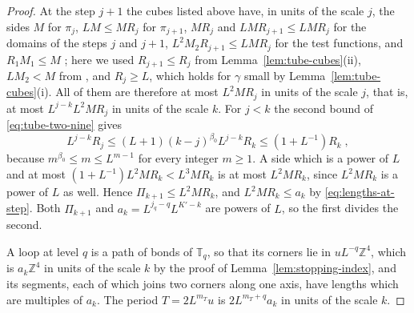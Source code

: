 \documentclass[11pt]{preprint}
\numberwithin{equation}{section}
\theoremstyle{definition}
\theoremstyle{remark}
\theoremstyle{plain}
\begin{document}
\begin{proof}
At the step $j + 1$ the cubes listed above have, in units of the scale $j$, the sides $M$ for $\pi_j$, $LM \leq MR_j$ for $\pi_{j+1}$, $MR_j$ and $LMR_{j+1} \leq LMR_j$ for the domains of the steps $j$ and $j + 1$, $L^2M_2R_{j+1} \leq LMR_j$ for the test functions, and $R_1M_1 \leq M$ \cite[p.~3]{BalabanRG2}; here we used $R_{j+1} \leq R_j$ from Lemma~\ref{lem:tube-cubes}(ii), $LM_2 < M$ from \cite[(3.1)]{WilsonFirstStep}, and $R_j \geq L$, which holds for $\gamma$ small by Lemma~\ref{lem:tube-cubes}(i). All of them are therefore at most $L^2MR_j$ in units of the scale $j$, that is, at most $L^{j-k}L^2MR_j$ in units of the scale $k$. For $j < k$ the second bound of \eqref{eq:tube-two-nine} gives
\begin{equation}\label{eq:period-scale-comparison}
    L^{j-k}R_j \leq (L + 1)(k - j)^{\beta_0}L^{j-k}R_k \leq (1 + L^{-1})R_k\;,
\end{equation}
because $m^{\beta_0} \leq m \leq L^{m-1}$ for every integer $m \geq 1$. A side which is a power of $L$ and at most $(1 + L^{-1})L^2MR_k < L^3MR_k$ is at most $L^2MR_k$, since $L^2MR_k$ is a power of $L$ as well. Hence $\Pi_{k+1} \leq L^2MR_k$, and $L^2MR_k \leq a_k$ by \eqref{eq:lengths-at-step}. Both $\Pi_{k+1}$ and $a_k = L^{j_q-q}L^{K'-k}$ are powers of $L$, so the first divides the second.

A loop at level $q$ is a path of bonds of $\mathbb T_q$, so that its corners lie in $uL^{-q}\mathbb Z^4$, which is $a_k\mathbb Z^4$ in units of the scale $k$ by the proof of Lemma~\ref{lem:stopping-index}, and its segments, each of which joins two corners along one axis, have lengths which are multiples of $a_k$. The period $T = 2L^{m_T}u$ is $2L^{m_T+q}a_k$ in units of the scale $k$.
\end{proof}
\end{document}
